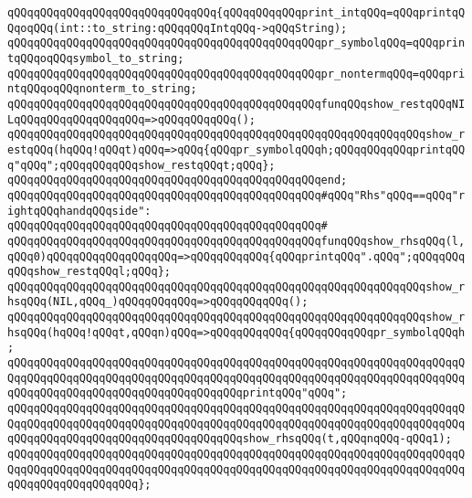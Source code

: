 \verb|qQQqqQQqqQQqqQQqqQQqqQQqqQQqqQQq{qQQqqQQqqQQqprint_intqQQq=qQQqprintqQQqoqQQq(int::to_string:qQQqqQQqIntqQQq->qQQqString);|\newline
\verb|qQQqqQQqqQQqqQQqqQQqqQQqqQQqqQQqqQQqqQQqqQQqqQQqpr_symbolqQQq=qQQqprintqQQqoqQQqsymbol_to_string;|\newline
\verb|qQQqqQQqqQQqqQQqqQQqqQQqqQQqqQQqqQQqqQQqqQQqqQQqpr_nontermqQQq=qQQqprintqQQqoqQQqnonterm_to_string;|\newline
\newline
\verb|qQQqqQQqqQQqqQQqqQQqqQQqqQQqqQQqqQQqqQQqqQQqqQQqfunqQQqshow_restqQQqNILqQQqqQQqqQQqqQQqqQQq=>qQQqqQQqqQQq();|\newline
\verb|qQQqqQQqqQQqqQQqqQQqqQQqqQQqqQQqqQQqqQQqqQQqqQQqqQQqqQQqqQQqqQQqshow_restqQQq(hqQQq!qQQqt)qQQq=>qQQq{qQQqpr_symbolqQQqh;qQQqqQQqqQQqprintqQQq"qQQq";qQQqqQQqqQQqshow_restqQQqt;qQQq};|\newline
\verb|qQQqqQQqqQQqqQQqqQQqqQQqqQQqqQQqqQQqqQQqqQQqqQQqend;|\newline
\newline
\verb|qQQqqQQqqQQqqQQqqQQqqQQqqQQqqQQqqQQqqQQqqQQqqQQq#qQQq"Rhs"qQQq==qQQq"rightqQQqhandqQQqside":|\newline
\verb|qQQqqQQqqQQqqQQqqQQqqQQqqQQqqQQqqQQqqQQqqQQqqQQq#|\newline
\verb|qQQqqQQqqQQqqQQqqQQqqQQqqQQqqQQqqQQqqQQqqQQqqQQqfunqQQqshow_rhsqQQq(l,qQQq0)qQQqqQQqqQQqqQQqqQQq=>qQQqqQQqqQQq{qQQqprintqQQq".qQQq";qQQqqQQqqQQqshow_restqQQql;qQQq};|\newline
\verb|qQQqqQQqqQQqqQQqqQQqqQQqqQQqqQQqqQQqqQQqqQQqqQQqqQQqqQQqqQQqqQQqshow_rhsqQQq(NIL,qQQq_)qQQqqQQqqQQq=>qQQqqQQqqQQq();|\newline
\verb|qQQqqQQqqQQqqQQqqQQqqQQqqQQqqQQqqQQqqQQqqQQqqQQqqQQqqQQqqQQqqQQqshow_rhsqQQq(hqQQq!qQQqt,qQQqn)qQQq=>qQQqqQQqqQQq{qQQqqQQqqQQqpr_symbolqQQqh;|\newline
\verb|qQQqqQQqqQQqqQQqqQQqqQQqqQQqqQQqqQQqqQQqqQQqqQQqqQQqqQQqqQQqqQQqqQQqqQQqqQQqqQQqqQQqqQQqqQQqqQQqqQQqqQQqqQQqqQQqqQQqqQQqqQQqqQQqqQQqqQQqqQQqqQQqqQQqqQQqqQQqqQQqqQQqqQQqqQQqqQQqprintqQQq"qQQq";|\newline
\verb|qQQqqQQqqQQqqQQqqQQqqQQqqQQqqQQqqQQqqQQqqQQqqQQqqQQqqQQqqQQqqQQqqQQqqQQqqQQqqQQqqQQqqQQqqQQqqQQqqQQqqQQqqQQqqQQqqQQqqQQqqQQqqQQqqQQqqQQqqQQqqQQqqQQqqQQqqQQqqQQqqQQqqQQqqQQqqQQqshow_rhsqQQq(t,qQQqnqQQq-qQQq1);|\newline
\verb|qQQqqQQqqQQqqQQqqQQqqQQqqQQqqQQqqQQqqQQqqQQqqQQqqQQqqQQqqQQqqQQqqQQqqQQqqQQqqQQqqQQqqQQqqQQqqQQqqQQqqQQqqQQqqQQqqQQqqQQqqQQqqQQqqQQqqQQqqQQqqQQqqQQqqQQqqQQqqQQq};|\newline
